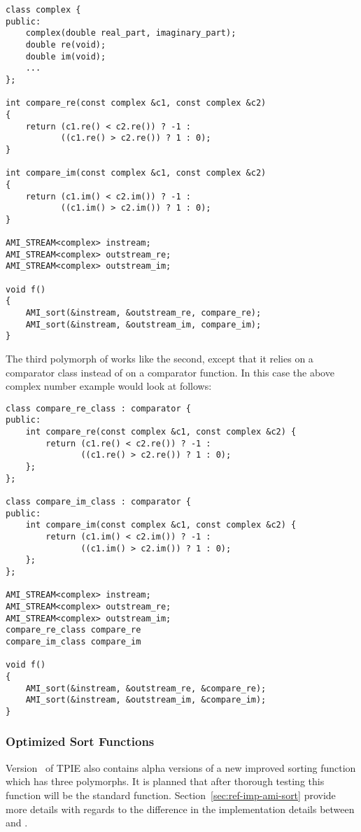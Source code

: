 \begin{verbatim}
class complex {
public:
    complex(double real_part, imaginary_part);
    double re(void);
    double im(void);
    ...
};

int compare_re(const complex &c1, const complex &c2)
{
    return (c1.re() < c2.re()) ? -1 :
           ((c1.re() > c2.re()) ? 1 : 0);
}

int compare_im(const complex &c1, const complex &c2)
{
    return (c1.im() < c2.im()) ? -1 :
           ((c1.im() > c2.im()) ? 1 : 0);
}

AMI_STREAM<complex> instream;
AMI_STREAM<complex> outstream_re;
AMI_STREAM<complex> outstream_im;

void f()
{
    AMI_sort(&instream, &outstream_re, compare_re);
    AMI_sort(&instream, &outstream_im, compare_im);
}
\end{verbatim}

The third polymorph of  works like the second, except that
it relies on a comparator class instead of on a comparator function. In this
case the above complex number example would look at follows:

\begin{verbatim}
class compare_re_class : comparator {
public:
    int compare_re(const complex &c1, const complex &c2) {
        return (c1.re() < c2.re()) ? -1 :
               ((c1.re() > c2.re()) ? 1 : 0);
    };
};

class compare_im_class : comparator {
public:
    int compare_im(const complex &c1, const complex &c2) {
        return (c1.im() < c2.im()) ? -1 :
               ((c1.im() > c2.im()) ? 1 : 0);
    };
};

AMI_STREAM<complex> instream;
AMI_STREAM<complex> outstream_re;
AMI_STREAM<complex> outstream_im;
compare_re_class compare_re
compare_im_class compare_im

void f()
{
    AMI_sort(&instream, &outstream_re, &compare_re);
    AMI_sort(&instream, &outstream_im, &compare_im);
}
\end{verbatim}



\subsubsection{Optimized Sort Functions}

Version \version~of TPIE also contains alpha versions of a new improved
sorting function\\ %
 which has three polymorphs. It is planned that
after thorough testing this function will be the standard 
function. Section~\ref{sec:ref-imp-ami-sort} provide more details with
regards to the difference in the implementation details between
 and .

